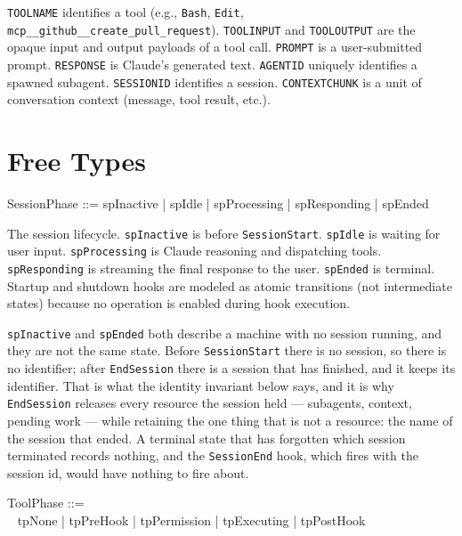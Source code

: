 \documentclass[a4paper,10pt,fleqn]{article}
\begin{document}
\begin{zed}
\end{zed}

\texttt{TOOLNAME} identifies a tool (e.g., \texttt{Bash}, \texttt{Edit},
\texttt{mcp\_\_github\_\_create\_pull\_request}). \texttt{TOOLINPUT} and
\texttt{TOOLOUTPUT} are the opaque input and output payloads of a tool
call. \texttt{PROMPT} is a user-submitted prompt. \texttt{RESPONSE} is
Claude's generated text. \texttt{AGENTID} uniquely identifies a spawned
subagent. \texttt{SESSIONID} identifies a session. \texttt{CONTEXTCHUNK}
is a unit of conversation context (message, tool result, etc.).

\section{Free Types}

\begin{zed}
  SessionPhase ::= spInactive | spIdle | spProcessing | spResponding | spEnded
\end{zed}

The session lifecycle. \texttt{spInactive} is before \texttt{SessionStart}.
\texttt{spIdle} is waiting for user input. \texttt{spProcessing} is Claude
reasoning and dispatching tools. \texttt{spResponding} is streaming the
final response to the user. \texttt{spEnded} is terminal. Startup and
shutdown hooks are modeled as atomic transitions (not intermediate states)
because no operation is enabled during hook execution.

\texttt{spInactive} and \texttt{spEnded} both describe a machine with no
session running, and they are not the same state. Before
\texttt{SessionStart} there is no session, so there is no identifier;
after \texttt{EndSession} there is a session that has finished, and it
keeps its identifier. That is what the identity invariant below says, and
it is why \texttt{EndSession} releases every resource the session held ---
subagents, context, pending work --- while retaining the one thing that is
not a resource: the name of the session that ended. A terminal state that
has forgotten which session terminated records nothing, and the
\texttt{SessionEnd} hook, which fires with the session id, would have
nothing to fire about.

\begin{zed}
  ToolPhase ::= \\
  \quad~ tpNone | tpPreHook | tpPermission | tpExecuting | tpPostHook
\end{zed}
\end{document}
